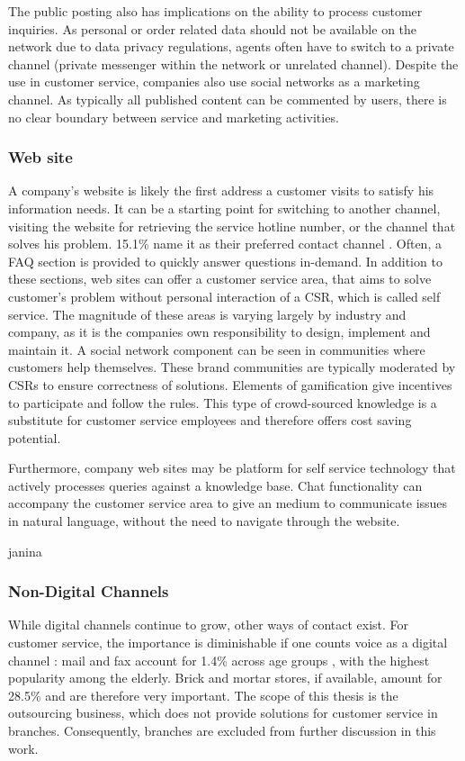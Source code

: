		The public posting also has implications on the ability to process customer inquiries. As personal or order related data should not be available on the network due to data privacy regulations, agents often have to switch to a private channel (\ie private messenger within the network or unrelated channel). Despite the use in customer service, companies also use social networks as a marketing channel. As typically all published content can be commented by users, there is no clear boundary between service and marketing activities. 
		
		
		\subsubsection{Web site}
		
		A company's website is likely the first address a customer visits to satisfy his information needs. It can be a starting point for switching to another channel, \ie visiting the website for retrieving the service hotline number, or the channel that solves his problem. 15.1\% name it as their preferred contact channel \cite{Agnischock2015}. Often, a \acrfull{FAQ} section is provided to quickly answer questions in-demand. In addition to these sections, web sites can offer a customer service area, that aims to solve customer's problem without personal interaction of a \acrshort{CSR}, which is called self service. The magnitude of these areas is varying largely by industry and company, as it is the companies own responsibility to design, implement and maintain it. A social network component can be seen in communities where customers help themselves. These brand communities \cite{Hsieh_2017} are typically moderated by \acrshort{CSR}s to ensure correctness of solutions. Elements of gamification give incentives to participate and follow the rules. This type of crowd-sourced knowledge is a substitute for customer service employees and therefore offers cost saving potential. 
		
		Furthermore, company web sites may be platform for self service technology that actively processes queries against a knowledge base. Chat functionality can  accompany the customer service area to give an medium to communicate issues in natural language, without the need to navigate through the website. 
	
		
		janina
		\subsubsection{Non-Digital Channels}
		While digital channels continue to grow, other ways of contact exist. For customer service, the importance is diminishable if one counts voice as a digital channel : mail and fax account for 1.4\% across age groups \cite{Agnischock2015}, with the highest popularity among the elderly. Brick and mortar stores, if available, amount for 28.5\% and are therefore very important. The scope of this thesis is the outsourcing business, which does not provide solutions for customer service in branches. Consequently, branches are excluded from further discussion in this work. 
		
